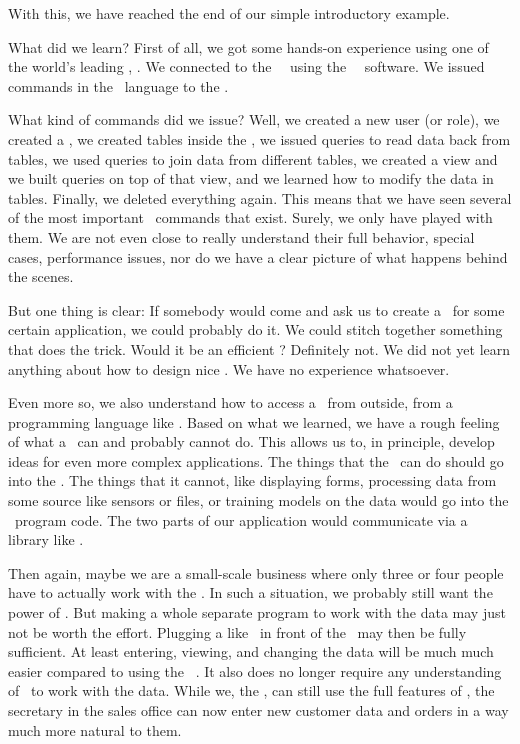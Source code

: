 %
%
%
With this, we have reached the end of our simple introductory example.

What did we learn?
First of all, we got some hands-on experience using one of the world's leading \dbms, \postgresql.
We connected to the \postgresql\ \server\ using the \psql\ \client\ software.
We issued commands in the \sql\ language to the \dbms.

What kind of commands did we issue?
Well, we created a new user (or role), we created a \db, we created tables inside the \db, we issued queries to read data back from tables, we used queries to join data from different tables, we created a view and we built queries on top of that view, and we learned how to modify the data in tables.
Finally, we deleted everything again.
This means that we have seen several of the most important \sql\ commands that exist.
Surely, we only have played with them.
We are not even close to really understand their full behavior, special cases, performance issues, nor do we have a clear picture of what happens behind the scenes.

But one thing is clear:
If somebody would come and ask us to create a \db\ for some certain application, we could probably do it.
We could stitch together something that does the trick.
Would it be an efficient \db?
Definitely not.
We did not yet learn anything about how to design nice \dbs.
We have no experience whatsoever.

Even more so, we also understand how to access a \db\ from outside, from a programming language like \python.
Based on what we learned, we have a rough feeling of what a \dbms\ can and probably cannot do.
This allows us to, in principle, develop ideas for even more complex applications.
The things that the \dbms\ can do should go into the \db.
The things that it cannot, like displaying forms, processing data from some source like sensors or files, or training  models on the data would go into the \python\ program code.
The two parts of our application would communicate via a library like \psycopg.

Then again, maybe we are a small-scale business where only three or four people have to actually work with the \db.
In such a situation, we probably still want the power of \postgresql.
But making a whole separate program to work with the data may just not be worth the effort.
Plugging a  like \libreofficeBase\ in front of the \db\ may then be fully sufficient.
At least entering, viewing, and changing the data will be much much easier compared to using the \psql\ \client.
It also does no longer require any understanding of \sql\ to work with the data.
While we, the , can still use the full features of \postgresql, the secretary in the sales office can now enter new customer data and orders in a way much more natural to them.

